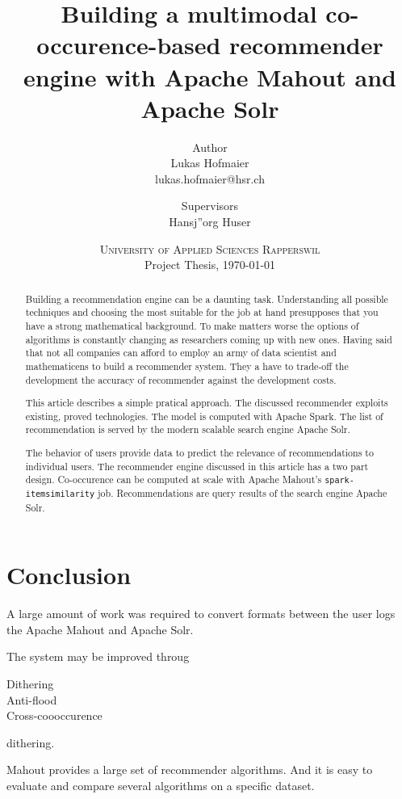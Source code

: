 \documentclass[twoside,a4paper]{article}
\title{ Building a multimodal co-occurence-based recommender engine with Apache Mahout and Apache Solr }
\author{
	Author \\
	Lukas Hofmaier \\
	lukas.hofmaier@hsr.ch
 	\and
	Supervisors \\
        Hansj''org Huser
}
\date{
	\textsc{University of Applied Sciences Rapperswil}\\
	Project Thesis,
	\today
}
\begin{document}
\maketitle
\tableofcontents

\begin{abstract}
Building a recommendation engine can be a daunting task. Understanding all possible techniques and choosing the most suitable for the job at hand presupposes that you have a strong mathematical background. To make matters worse the options of algorithms is constantly changing as researchers coming up with new ones. Having said that not all companies can afford to employ an army of data scientist and mathematicens to build a recommender system. They a have to trade-off the development the accuracy of recommender against the development costs. 

This article describes a simple pratical approach. The discussed recommender exploits existing, proved technologies. The model is computed with Apache Spark. The list of recommendation is served by the modern scalable search engine Apache Solr.

The behavior of users provide data to predict the relevance of recommendations to individual users. The recommender engine discussed in this article has a two part design.
Co-occurence can be computed at scale with Apache Mahout's \verb|spark-itemsimilarity| job.
Recommendations are query results of the search engine Apache Solr.
\end{abstract}





\section{Conclusion}
\label{sec:similarity}

A large amount of work was required to convert formats between the user logs the Apache Mahout and Apache Solr.

The system may be improved throug 
\begin{description}
\item[Dithering] 
\item[Anti-flood] 
\item[Cross-coooccurence]
\end{description}
dithering.

Mahout provides a large set of recommender algorithms. And it is easy to evaluate and compare several algorithms on a specific dataset.
\end{document}
